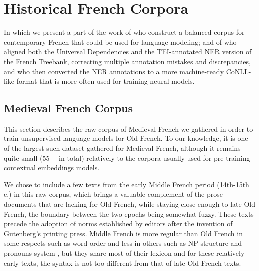 \chapter{Historical French Corpora}

\begin{center}
    \begin{minipage}{0.66\textwidth}
        \begin{small}
            In which we present a part of the work of \citet{popa-fabre-etal-2020-french} who construct a balanced corpus for contemporary French that could be used for language modeling; and of \citet{ortiz-suarez-etal-2020-establishing} who aligned both the Universal Dependencies and the TEI-annotated NER version of the French Treebank, correcting multiple annotation mistakes and discrepancies, and who then converted the NER annotations to a more machine-ready CoNLL-like format that is more often used for training neural models.
        \end{small}
    \end{minipage}
    \vspace{0.5cm}
\end{center}


\section{Medieval French Corpus}
\label{sec-data}

This section describes the raw corpus of Medieval French we gathered in order to train unsupervised language models for Old French.
To our knowledge, it is one of the largest such dataset gathered for Medieval French, although it remains quite small (\SI{55}{\mebi\byte} in total) relatively to the corpora usually used for pre-training contextual embeddings models.

We chose to include a few texts from the early Middle French period (14th-15th c.) in this raw corpus, which brings a valuable complement of the prose documents that are lacking for Old French, while staying close enough to late Old French, the boundary between the two epochs being somewhat fuzzy.
These texts precede the adoption of norms established by editors after the invention of Gutenberg's printing press. Middle French is more regular than Old French in some respects such as word order \citep{marchello-Nizia-etal-2020-grande} and less in others such as NP structure and pronouns system \citep{marchello-nizia-etal-1979-histoire}, but they share most of their lexicon and for these relatively early texts, the syntax is not too different from that of late Old French texts.

